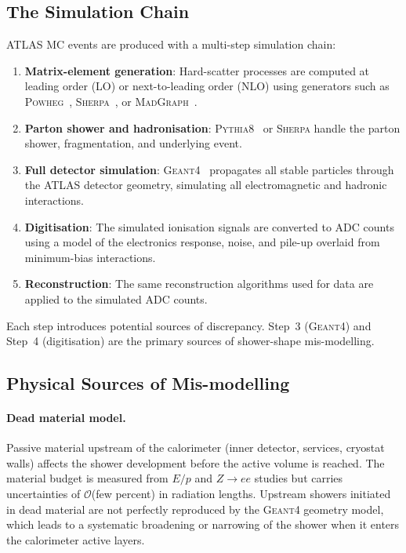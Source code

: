 \documentclass[11pt,a4paper]{article}
\begin{document}
\subsection{The Simulation Chain}
\label{sec:discrepancy:chain}

ATLAS MC events are produced with a multi-step simulation chain:
\begin{enumerate}[label=\arabic*.]
  \item \textbf{Matrix-element generation}: Hard-scatter processes are
        computed at leading order (LO) or next-to-leading order (NLO)
        using generators such as \textsc{Powheg}~\cite{Powheg:2004},
        \textsc{Sherpa}~\cite{Sherpa:2009}, or
        \textsc{MadGraph}~\cite{PDG:2024}.
  \item \textbf{Parton shower and hadronisation}:
        \textsc{Pythia8}~\cite{Pythia8:2015} or \textsc{Sherpa}
        handle the parton shower, fragmentation, and underlying event.
  \item \textbf{Full detector simulation}: \textsc{Geant4}~\cite{Geant4:2003}
        propagates all stable particles through the ATLAS detector
        geometry, simulating all electromagnetic and hadronic
        interactions.
  \item \textbf{Digitisation}: The simulated ionisation signals are
        converted to ADC counts using a model of the electronics
        response, noise, and pile-up overlaid from minimum-bias
        interactions.
  \item \textbf{Reconstruction}: The same reconstruction algorithms
        used for data are applied to the simulated ADC counts.
\end{enumerate}

Each step introduces potential sources of discrepancy.  Step~3
(\textsc{Geant4}) and Step~4 (digitisation) are the primary sources
of shower-shape mis-modelling.

\subsection{Physical Sources of Mis-modelling}
\label{sec:discrepancy:sources}

\paragraph{Dead material model.}
Passive material upstream of the calorimeter (inner detector,
services, cryostat walls) affects the shower development before the
active volume is reached.  The material budget is measured from
$E/p$ and $Z \to ee$ studies but carries uncertainties of
$\mathcal{O}$(few percent) in radiation lengths.  Upstream showers
initiated in dead material are not perfectly reproduced by the
\textsc{Geant4} geometry model, which leads to a systematic broadening
or narrowing of the shower when it enters the calorimeter active
layers.
\end{document}
